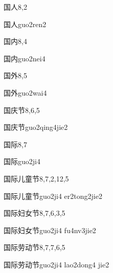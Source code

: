 \begin{entry}{国人}{8,2}
  \begin{phonetics}{国人}{guo2ren2}
  \end{phonetics}
\end{entry}

\begin{entry}{国内}{8,4}
  \begin{phonetics}{国内}{guo2nei4}
  \end{phonetics}
\end{entry}

\begin{entry}{国外}{8,5}
  \begin{phonetics}{国外}{guo2wai4}
  \end{phonetics}
\end{entry}

\begin{entry}{国庆节}{8,6,5}
  \begin{phonetics}{国庆节}{guo2qing4jie2}
  \end{phonetics}
\end{entry}

\begin{entry}{国际}{8,7}
  \begin{phonetics}{国际}{guo2ji4}
  \end{phonetics}
\end{entry}

\begin{entry}{国际儿童节}{8,7,2,12,5}
  \begin{phonetics}{国际儿童节}{guo2ji4 er2tong2jie2}
  \end{phonetics}
\end{entry}

\begin{entry}{国际妇女节}{8,7,6,3,5}
  \begin{phonetics}{国际妇女节}{guo2ji4 fu4nv3jie2}
  \end{phonetics}
\end{entry}

\begin{entry}{国际劳动节}{8,7,7,6,5}
  \begin{phonetics}{国际劳动节}{guo2ji4 lao2dong4 jie2}
  \end{phonetics}
\end{entry}

